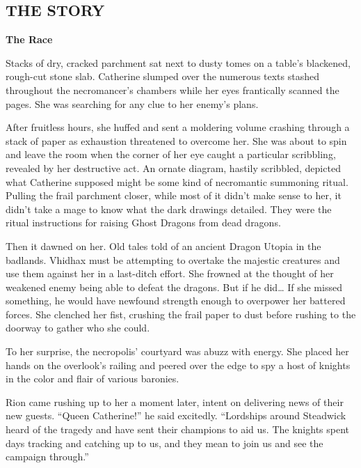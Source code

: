\newpage

\begin{multicols*}{2}

\subsection*{\MakeUppercase{The story}}

\textbf{The Race}

Stacks of dry, cracked parchment sat next to dusty tomes on a table's blackened, rough-cut stone slab.
Catherine slumped over the numerous texts stashed throughout the necromancer's chambers while her eyes frantically scanned the pages.
She was searching for any clue to her enemy's plans.

After fruitless hours, she huffed and sent a moldering volume crashing through a stack of paper as exhaustion threatened to overcome her.
She was about to spin and leave the room when the corner of her eye caught a particular scribbling, revealed by her destructive act.
An ornate diagram, hastily scribbled, depicted what Catherine supposed might be some kind of necromantic summoning ritual.
Pulling the frail parchment closer, while most of it didn't make sense to her, it didn't take a mage to know what the dark drawings detailed.
They were the ritual instructions for raising Ghost Dragons from dead dragons.

Then it dawned on her.
Old tales told of an ancient Dragon Utopia in the badlands.
Vhidhax must be attempting to overtake the majestic creatures and use them against her in a last-ditch effort.
She frowned at the thought of her weakened enemy being able to defeat the dragons.
But if he did… If she missed something, he would have newfound strength enough to overpower her battered forces.
She clenched her fist, crushing the frail paper to dust before rushing to the doorway to gather who she could.

To her surprise, the necropolis' courtyard was abuzz with energy.
She placed her hands on the overlook's railing and peered over the edge to spy a host of knights in the color and flair of various baronies.

Rion came rushing up to her a moment later, intent on delivering news of their new guests.
``Queen Catherine!'' he said excitedly.
``Lordships around Steadwick heard of the tragedy and have sent their champions to aid us.
The knights spent days tracking and catching up to us, and they mean to join us and see the campaign through.''


\end{multicols*}
